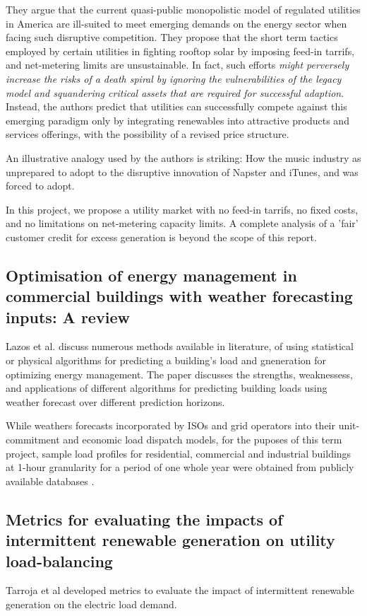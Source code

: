 \documentclass[a4paper]{article}
\begin{document}
They argue that the current quasi-public monopolistic model of regulated utilities in America are ill-suited to meet emerging demands on the energy sector when facing such disruptive competition. They propose that the short term tactics employed by certain utilities\cite{marc} in fighting rooftop solar by imposing feed-in tarrifs, and net-metering limits are unsustainable. In fact, such efforts \textit{might perversely increase the risks of a death spiral by ignoring the vulnerabilities of the legacy model and squandering critical assets that are required for successful adaption}. Instead, the authors predict that utilities can successfully compete against this emerging paradigm only by integrating renewables into attractive products and services offerings, with the possibility of a revised price structure.

An illustrative analogy used by the authors is striking: How the music industry as unprepared to adopt to the disruptive innovation of Napster and iTunes, and was forced to adopt. 

In this project, we propose a utility market with no feed-in tarrifs, no fixed costs, and no limitations on net-metering capacity limits. A complete analysis of a 'fair' customer credit for excess generation is beyond the scope of this report. 

\subsection{Optimisation of energy management in commercial buildings with weather forecasting inputs: A review}
Lazos et al.\cite{lazos2014optimisation} discuss numerous methods available in literature, of using statistical or physical algorithms for predicting a building's load and gneneration for optimizing energy management. The paper discusses the strengths, weaknessess, and applications of different algorithms for  predicting building loads using weather forecast over different prediction horizons. 

While weathers forecasts incorporated by ISOs and grid operators into their unit-commitment and economic load dispatch models, for the puposes of this term project, sample load profiles for residential, commercial and industrial buildings at 1-hour granularity for a period of one whole year were obtained from publicly available databases \cite{clain1generating}. 

\subsection{Metrics for evaluating the impacts of intermittent renewable generation on utility load-balancing}
Tarroja et al \cite{tarroja2012metrics} developed metrics to evaluate the impact of intermittent renewable generation on the electric load demand. 
\end{document}
